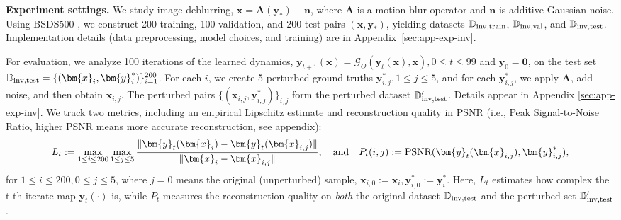 \documentclass{amsart} %
\def\vzero{{\bm{0}}}
\def\vn{{\bm{n}}}
\def\vx{{\bm{x}}}
\def\vy{{\bm{y}}}
\def\mA{{\bm{A}}}
\def\sD{{\mathbb{D}}}
\def\cG{{\mathcal{G}}}
\theoremstyle{definition}
\theoremstyle{remark}
\begin{document}
\textbf{Experiment settings.} We study image deblurring, $\vx = \mA(\vy_\ast) + \vn$, where $\mA$ is a motion-blur operator and $\vn$ is additive Gaussian noise. Using BSDS500 \cite{MartinFTM01}, we construct 200 training, 100 validation, and 200 test pairs $(\vx,\vy_\ast)$, yielding datasets $\sD_{\textup{inv,train}}$, $\sD_{\textup{inv,val}}$, and $\sD_{\textup{inv,test}}$. Implementation details (data preprocessing, model choices, and training) are in Appendix~\ref{sec:app-exp-inv}.



For evaluation, we analyze 100 iterations of the learned dynamics, $\vy_{t+1}(\vx)=\cG_{\Theta}(\vy_t(\vx),\vx), 0 \leq t \leq 99$ and $\vy_0 = \vzero$, on the test set $\sD_{\textup{inv,test}}=\{(\vx_i,\vy^\ast_{i})\}_{i=1}^{200}$. For each $i$, we create 5 perturbed ground truths $\vy^\ast_{i,j}, 1 \leq j \leq 5$, and for each $\vy^\ast_{i,j}$, we apply $\mA$, add noise, and then obtain $\vx_{i,j}$. The perturbed pairs $\{(\vx_{i,j},\vy^\ast_{i,j})\}_{i,j}$ form the perturbed dataset $\sD^\prime_{\textup{inv,test}}$. Details appear in Appendix \ref{sec:app-exp-inv}. We track two metrics, including an empirical Lipschitz estimate and reconstruction quality in PSNR (i.e., Peak Signal-to-Noise Ratio, higher PSNR means more accurate reconstruction, see appendix):
\[L_t := \max_{1 \leq i \leq 200}\max_{1 \leq j \leq 5} \frac{\| \vy_t(\vx_{i}) - \vy_t(\vx_{i,j}) \|}{ \|\vx_{i} - \vx_{i,j}\| }, \quad \textup{and} \quad P_t(i,j) := \textup{PSNR}(\vy_t(\vx_{i,j}), \vy^\ast_{i,j}),
\]
for $1 \leq i \leq 200, 0 \leq j \leq 5$, 
where $j=0$ means the original (unperturbed) sample, $\vx_{i,0}:=\vx_i,\vy^\ast_{i,0}:=\vy^\ast_i$. 
Here, $L_t$ estimates how complex the t-th iterate map $\vy_t(\cdot)$ is, while $P_t$ measures the reconstruction quality on \textit{both} the original dataset $\sD_{\textup{inv,test}}$ and the perturbed set $\sD^\prime_{\textup{inv,test}}$.
\end{document}
